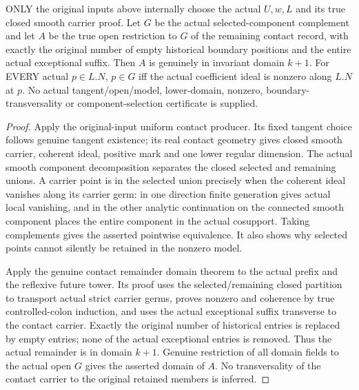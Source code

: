 \begin{theorem}
\label{hir:original-noncanonical-actual-nonzero-contact-domain}
\leanok
ONLY the original inputs above internally choose the actual $U,w,L$ and
its true closed smooth carrier proof. Let $G$ be the actual selected-component
complement and let $A$ be the true open restriction to $G$ of the remaining
contact record, with exactly the original number of empty historical
boundary positions and the entire actual exceptional suffix. Then $A$
is genuinely in invariant domain $k+1$. For EVERY actual $p\in L.N$,
$p\in G$ iff the actual coefficient ideal is nonzero along $L.N$ at $p$.
No actual tangent/open/model, lower-domain, nonzero, boundary-transversality
or component-selection certificate is supplied.
\end{theorem}
\begin{proof}
Apply the original-input uniform contact producer. Its fixed tangent
choice follows genuine tangent existence; its real contact geometry gives
closed smooth carrier, coherent ideal, positive mark and one lower
regular dimension. The actual smooth component decomposition separates
the closed selected and remaining unions. A carrier point is in the
selected union precisely when the coherent ideal vanishes along its
carrier germ: in one direction finite generation gives actual local
vanishing, and in the other analytic continuation on the connected
smooth component places the entire component in the actual cosupport.
Taking complements gives the asserted pointwise equivalence. It also
shows why selected points cannot silently be retained in the nonzero model.

Apply the genuine contact remainder domain theorem to the actual prefix
and the reflexive future tower. Its proof uses the selected/remaining
closed partition to transport actual strict carrier germs, proves nonzero
and coherence by true controlled-colon induction, and uses the actual
exceptional suffix transverse to the contact carrier. Exactly the original
number of historical entries is replaced by empty entries; none of the
actual exceptional entries is removed. Thus the actual remainder is in
domain $k+1$. Genuine restriction of all domain fields to the actual open
$G$ gives the asserted domain of $A$. No transversality of the contact
carrier to the original retained members is inferred.
\end{proof}

